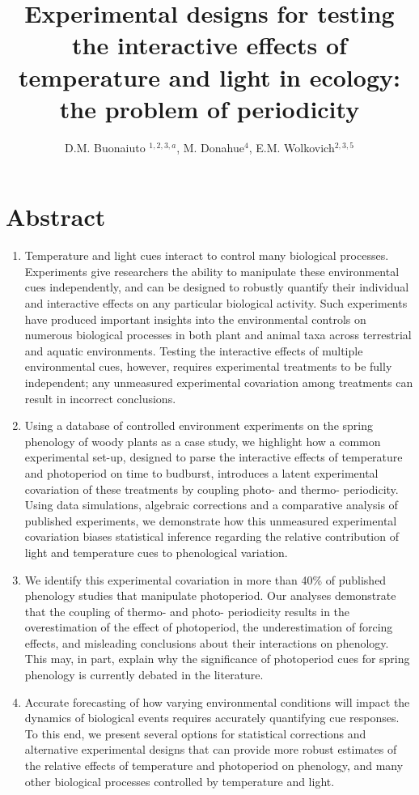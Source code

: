 \documentclass[11pt]{article}
\title{Experimental designs for testing the interactive effects of temperature and light in ecology: the problem of periodicity }
\date{}
\author{D.M. Buonaiuto $^{1,2,3,a}$, M. Donahue$^{4}$, E.M. Wolkovich$^{2,3,5}$}
\begin{document}
\section*{Abstract}
\begin{enumerate}
\item Temperature and light cues interact to control many biological processes. Experiments give researchers the ability to manipulate these environmental cues independently, and can be designed to robustly quantify their individual and interactive effects on any particular biological activity. Such experiments have produced important insights into the environmental controls on numerous biological processes in both plant and animal taxa across terrestrial and aquatic environments. Testing the interactive effects of multiple environmental cues, however, requires experimental treatments to be fully independent; any unmeasured experimental covariation among treatments can result in incorrect conclusions.

\item  Using a database of controlled environment experiments on the spring phenology of woody plants as a case study, we highlight how a common experimental set-up, designed to parse the interactive effects of temperature and photoperiod on time to budburst, introduces a latent experimental covariation of these treatments by coupling photo- and thermo- periodicity. Using data simulations, algebraic corrections and a comparative analysis of published experiments, we demonstrate how this unmeasured experimental covariation biases statistical inference regarding the relative contribution of light and temperature cues to phenological variation.

\item We identify this experimental covariation in more than 40\% of published phenology studies that manipulate photoperiod. Our analyses demonstrate that the coupling of thermo- and photo- periodicity results in the overestimation of the effect of photoperiod, the underestimation of forcing effects, and misleading conclusions about their interactions on phenology. This may, in part, explain why the significance of photoperiod cues for spring phenology is currently debated in the literature.

\item Accurate forecasting of how varying environmental conditions will impact the dynamics of biological events requires accurately quantifying cue responses. To this end, we present several options for statistical corrections and alternative experimental designs that can provide more robust estimates of the relative effects of temperature and photoperiod on phenology, and many other biological processes controlled by temperature and light.
\end{enumerate}
\end{document}
